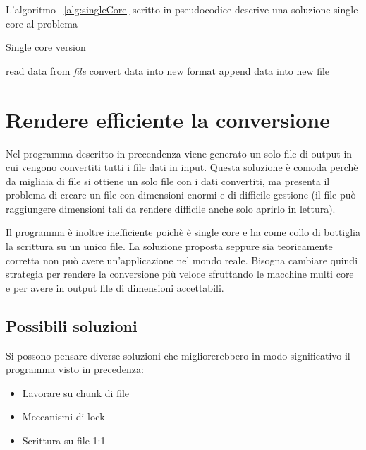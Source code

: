 \documentclass[../main.tex]{subfiles}
\begin{document}
L'algoritmo ~\ref{alg:singleCore} scritto in pseudocodice descrive una soluzione single core al problema

\begin{algorithm}
\caption{Single core version}
				\label{alg:singleCore}
\begin{algorithmic}[1]
\State read data from \textit{file}
\State convert data into new format
\State append data into new file
\EndFor

\EndProcedure
\end{algorithmic}
\end{algorithm}

\section{Rendere efficiente la conversione}

Nel programma descritto in precendenza viene generato un solo file di output in cui vengono convertiti tutti i file dati in input. Questa soluzione è comoda perchè da migliaia di file si ottiene un solo file con i dati convertiti, ma presenta il problema di creare un file con dimensioni enormi e di difficile gestione (il file può raggiungere dimensioni tali da rendere difficile anche solo aprirlo in lettura).


Il programma è inoltre inefficiente poichè è single core e ha come collo di bottiglia la scrittura su un unico file. 
La soluzione proposta seppure sia teoricamente corretta non può avere un'applicazione nel mondo reale. Bisogna cambiare quindi strategia per rendere la conversione più veloce sfruttando le macchine multi core e per avere in output file di dimensioni accettabili.

\subsection{Possibili soluzioni}
Si possono pensare diverse soluzioni che migliorerebbero in modo significativo il programma visto in precedenza:

\begin{itemize}
				\item Lavorare su chunk di file
				\item Meccanismi di lock
				\item Scrittura su file 1:1
\end{itemize}
\end{document}
